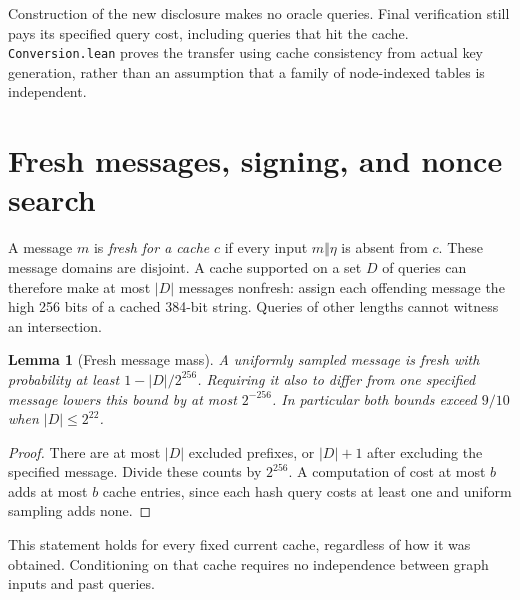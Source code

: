 \documentclass[10pt]{article}
\newtheorem{lemma}[theorem]{Lemma}
\begin{document}
Construction of the new disclosure makes no oracle queries. Final verification still pays its specified query cost, including queries that hit the cache. \texttt{Conversion.lean} proves the transfer using cache consistency from actual key generation, rather than an assumption that a family of node-indexed tables is independent.

\section{Fresh messages, signing, and nonce search}\label{sec:fresh}

A message $m$ is \emph{fresh for a cache} $c$ if every input $m\Vert\eta$ is absent from $c$. These message domains are disjoint. A cache supported on a set $D$ of queries can therefore make at most $|D|$ messages nonfresh: assign each offending message the high 256 bits of a cached 384-bit string. Queries of other lengths cannot witness an intersection.

\begin{lemma}[Fresh message mass]\label{lem:fresh}
A uniformly sampled message is fresh with probability at least $1-|D|/2^{256}$. Requiring it also to differ from one specified message lowers this bound by at most $2^{-256}$. In particular both bounds exceed $9/10$ when $|D|\le2^{22}$.
\end{lemma}
\begin{proof}
There are at most $|D|$ excluded prefixes, or $|D|+1$ after excluding the specified message. Divide these counts by $2^{256}$. A computation of cost at most $b$ adds at most $b$ cache entries, since each hash query costs at least one and uniform sampling adds none.
\end{proof}

This statement holds for every fixed current cache, regardless of how it was obtained. Conditioning on that cache requires no independence between graph inputs and past queries.
\end{document}

